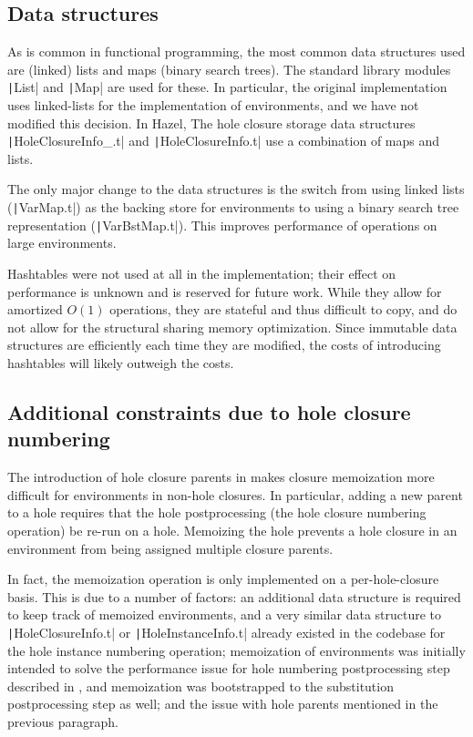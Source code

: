 \subsection{Data structures}
\label{sec:data-structures}

As is common in functional programming, the most common data structures used are (linked) lists and maps (binary search trees). The standard library modules \texttt|List| and \texttt|Map| are used for these. In particular, the original implementation uses linked-lists for the implementation of environments, and we have not modified this decision. In Hazel, The hole closure storage data structures \texttt|HoleClosureInfo_.t| and \texttt|HoleClosureInfo.t| use a combination of maps and lists.

The only major change to the data structures is the switch from using linked lists (\texttt|VarMap.t|) as the backing store for environments to using a binary search tree representation (\texttt|VarBstMap.t|). This improves performance of operations on large environments.

Hashtables were not used at all in the implementation; their effect on performance is unknown and is reserved for future work. While they allow for amortized $O(1)$ operations, they are stateful and thus difficult to copy, and do not allow for the structural sharing memory optimization. Since immutable data structures are efficiently each time they are modified, the costs of introducing hashtables will likely outweigh the costs.

\subsection{Additional constraints due to hole closure numbering}
\label{sec:difficulties-hole-numbering}

The introduction of hole closure parents in  makes closure memoization more difficult for environments in non-hole closures. In particular, adding a new parent to a hole requires that the hole postprocessing (the hole closure numbering operation) be re-run on a hole. Memoizing the hole prevents a hole closure in an environment from being assigned multiple closure parents.

In fact, the memoization operation is only implemented on a per-hole-closure basis. This is due to a number of factors: an additional data structure is required to keep track of memoized environments, and a very similar data structure to \texttt|HoleClosureInfo.t| or \texttt|HoleInstanceInfo.t| already existed in the codebase for the hole instance numbering operation; memoization of environments was initially intended to solve the performance issue for hole numbering postprocessing step described in , and memoization was bootstrapped to the substitution postprocessing step as well; and the issue with hole parents mentioned in the previous paragraph.

